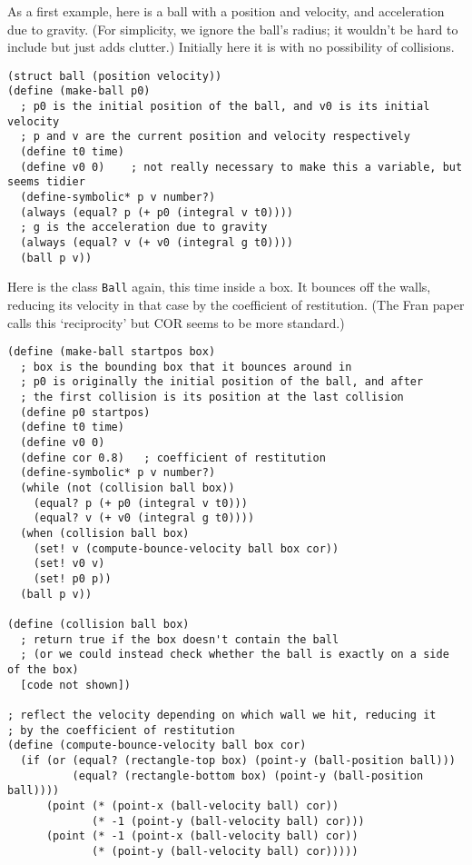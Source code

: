\documentclass{article}
\begin{document}
As a first example, here is a ball with a position and velocity, and
acceleration due to gravity.  (For simplicity, we ignore the ball's radius;
it wouldn't be hard to include but just adds clutter.)  Initially here it
is with no possibility of collisions.


\begin{verbatim}
(struct ball (position velocity))
(define (make-ball p0)
  ; p0 is the initial position of the ball, and v0 is its initial velocity
  ; p and v are the current position and velocity respectively
  (define t0 time)
  (define v0 0)    ; not really necessary to make this a variable, but seems tidier
  (define-symbolic* p v number?)
  (always (equal? p (+ p0 (integral v t0))))
  ; g is the acceleration due to gravity
  (always (equal? v (+ v0 (integral g t0))))
  (ball p v))
\end{verbatim}

Here is the class \verb|Ball| again, this time inside a box.  It
bounces off the walls, reducing its velocity in that case by the
coefficient of restitution.  (The Fran paper calls this `reciprocity'
but COR seems to be more standard.)

\begin{verbatim}
(define (make-ball startpos box)
  ; box is the bounding box that it bounces around in
  ; p0 is originally the initial position of the ball, and after
  ; the first collision is its position at the last collision
  (define p0 startpos)
  (define t0 time)
  (define v0 0)
  (define cor 0.8)   ; coefficient of restitution
  (define-symbolic* p v number?)
  (while (not (collision ball box))
    (equal? p (+ p0 (integral v t0)))
    (equal? v (+ v0 (integral g t0))))
  (when (collision ball box)
    (set! v (compute-bounce-velocity ball box cor))
    (set! v0 v)
    (set! p0 p))
  (ball p v))
    
(define (collision ball box)
  ; return true if the box doesn't contain the ball
  ; (or we could instead check whether the ball is exactly on a side of the box)
  [code not shown])

; reflect the velocity depending on which wall we hit, reducing it
; by the coefficient of restitution 
(define (compute-bounce-velocity ball box cor)
  (if (or (equal? (rectangle-top box) (point-y (ball-position ball)))
          (equal? (rectangle-bottom box) (point-y (ball-position ball))))
      (point (* (point-x (ball-velocity ball) cor))
             (* -1 (point-y (ball-velocity ball) cor)))
      (point (* -1 (point-x (ball-velocity ball) cor))
             (* (point-y (ball-velocity ball) cor)))))
\end{verbatim}
\end{document}
